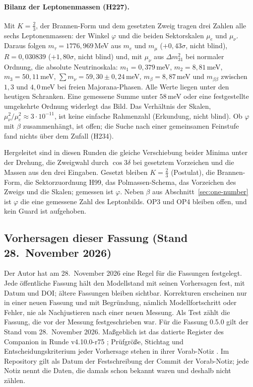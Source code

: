 \paragraph{Bilanz der Leptonenmassen (H227).}
Mit \(K=\tfrac23\), der Brannen-Form und dem gesetzten Zweig tragen drei Zahlen alle sechs Leptonenmassen: der Winkel \(\varphi\) und die beiden
Sektorskalen \(\mu_e\) und \(\mu_\nu\). Daraus folgen \(m_\tau=1776{,}969\)\,MeV aus \(m_e\) und \(m_\mu\) (\(+0{,}43\sigma\), nicht blind),
\(R=0{,}030839\) (\(+1{,}80\sigma\), nicht blind) und, mit \(\mu_\nu\) aus \(\Delta m^2_{31}\) bei normaler Ordnung, die absolute Neutrinoskala:
\(m_1=0{,}379\)\,meV, \(m_2=8{,}81\)\,meV, \(m_3=50{,}11\)\,meV, \(\sum m_\nu=59{,}30\pm0{,}24\)\,meV, \(m_\beta=8{,}87\)\,meV und \(m_{\beta\beta}\) zwischen
\(1{,}3\) und \(4{,}0\)\,meV bei freien Majorana-Phasen. Alle Werte liegen unter den heutigen Schranken. Eine gemessene Summe unter \(58\)\,meV oder
eine festgestellte umgekehrte Ordnung widerlegt das Bild. Das Verhältnis der Skalen, \(\mu_\nu^2/\mu_e^2\approx3\cdot10^{-11}\), ist keine einfache
Rahmenzahl (Erkundung, nicht blind). Ob \(\varphi\) mit \(\beta\) zusammenhängt, ist offen; die Suche nach einer gemeinsamen Feinstufe fand nichts
über dem Zufall (H234).

Hergeleitet sind in diesen Runden die gleiche Verschiebung beider Minima unter der Drehung, die Zweigwahl durch \(\cos3\delta\) bei gesetztem
Vorzeichen und die Massen aus den drei Eingaben. Gesetzt bleiben \(K=\tfrac23\) (Postulat), die Brannen-Form, die Sektorzuordnung H99, das
Polmassen-Schema, das Vorzeichen des Zweigs und die Skalen; gemessen ist \(\varphi\). Neben \(\beta\) aus Abschnitt~\ref{sec:one-number} ist
\(\varphi\) die eine gemessene Zahl des Leptonbilds. OP3 und OP4 bleiben offen, und kein Guard ist aufgehoben.

\subsection{Vorhersagen dieser Fassung (Stand 28.~November 2026)}
\label{sec:predictions-0-5}

Der Autor hat am 28.~November 2026 eine Regel für die Fassungen festgelegt. Jede öffentliche Fassung hält den Modellstand mit seinen
Vorhersagen fest, mit Datum und DOI; ältere Fassungen bleiben sichtbar. Korrekturen erscheinen nur in einer neuen Fassung und mit Begründung,
nämlich Modellfortschritt oder Fehler, nie als Nachjustieren nach einer neuen Messung. Als Test zählt die Fassung, die vor der Messung
festgeschrieben war. Für die Fassung 0.5.0 gilt der Stand vom 28.~November 2026. Maßgeblich ist das datierte Register des Companion in Runde
v4.10.0-r75 \cite{layersr69r75}; Prüfgröße, Stichtag und Entscheidungskriterium jeder Vorhersage stehen in ihrer Vorab-Notiz \cite{predictions}. Im Repository gilt als Datum der
Festschreibung der Commit der Vorab-Notiz; jede Notiz nennt die Daten, die damals schon bekannt waren und deshalb nicht zählen.

